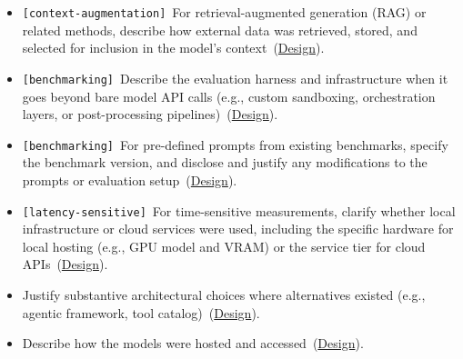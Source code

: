 \documentclass[smallextended]{svjour3}
\makeatletter
\newcommand{\must}{\textbf{must}\xspace}
\newcommand{\should}{\textbf{should}\xspace}
\newcommand{\iconM}{\usebox{\iconMbox}\xspace}
\newcommand{\iconS}{\usebox{\iconSbox}\xspace}
\newcommand{\iconM}{●\xspace}
\newcommand{\iconS}{○\xspace}
\newcommand{\condition}[1]{\texttt{\small[#1]}\,}
\newcommand{\condition}[1]{@@cond:#1@@}
\newcommand{\refdesign}{\hyperref[sec:report-system-and-prompt-design]{Design}}
\newcommand{\refdesign}{\href{/guidelines/design/}{Design}}
\makeatother
\begin{document}
\begin{appendices}
\begin{itemize}[label={},leftmargin=*]
    \item \iconM \condition{context-augmentation} For retrieval-augmented generation (RAG) or related methods, describe how external data was retrieved, stored, and selected for inclusion in the model's context~(\refdesign).
    \item \iconM \condition{benchmarking} Describe the evaluation harness and infrastructure when it goes beyond bare model API calls (e.g., custom sandboxing, orchestration layers, or post-processing pipelines)~(\refdesign).
    \item \iconM \condition{benchmarking} For pre-defined prompts from existing benchmarks, specify the benchmark version, and disclose and justify any modifications to the prompts or evaluation setup~(\refdesign).
    \item \iconM \condition{latency-sensitive} For time-sensitive measurements, clarify whether local infrastructure or cloud services were used, including the specific hardware for local hosting (e.g., GPU model and VRAM) or the service tier for cloud APIs~(\refdesign).
    \item \iconS Justify substantive architectural choices where alternatives existed (e.g., agentic framework, tool catalog)~(\refdesign).
    \item \iconS Describe how the models were hosted and accessed~(\refdesign).

\end{itemize}
\end{appendices}
\end{document}
